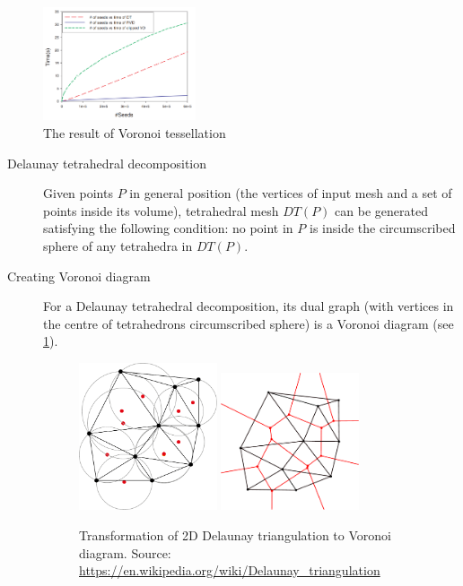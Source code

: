 \begin{figure}
        \centering
        \includegraphics[width=0.4\textwidth]{img/clipped}
        \caption{The result of Voronoi tessellation \cite{yan2010efficient}}
        \label{fig:voro}
\end{figure}

\begin{description}
    \item[Delaunay tetrahedral decomposition] Given points $P$ in general position (the vertices of input mesh and a set of points inside its volume), tetrahedral mesh $DT(P)$ can be generated satisfying the following condition: no point in $P$ is inside the circumscribed sphere of any tetrahedra in $DT(P)$.
    \item[Creating Voronoi diagram] For a Delaunay tetrahedral decomposition, its dual graph (with vertices in the centre of tetrahedrons circumscribed sphere) is a Voronoi diagram (see \cref{fig:voro}).
    
 \begin{figure}
    \centering
    \includegraphics[width=0.4\textwidth]{img/delaunay}
    \includegraphics[width=0.4\textwidth]{img/voronoi}
    \caption{Transformation of 2D Delaunay triangulation to Voronoi diagram. Source: \url{https://en.wikipedia.org/wiki/Delaunay\_triangulation}}
    \label{fig:DT}
\end{figure}


\end{description}
